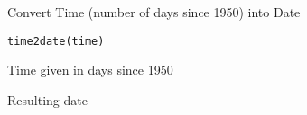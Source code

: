 %
\begin{Description}\relax
Convert Time (number of days since 1950) into Date
\end{Description}
%
\begin{Usage}
\begin{verbatim}
time2date(time)
\end{verbatim}
\end{Usage}
%
\begin{Arguments}
\begin{ldescription}
\item[\code{time}] 
Time given in days since 1950

\end{ldescription}
\end{Arguments}
%
\begin{Value}
Resulting date
\end{Value}
